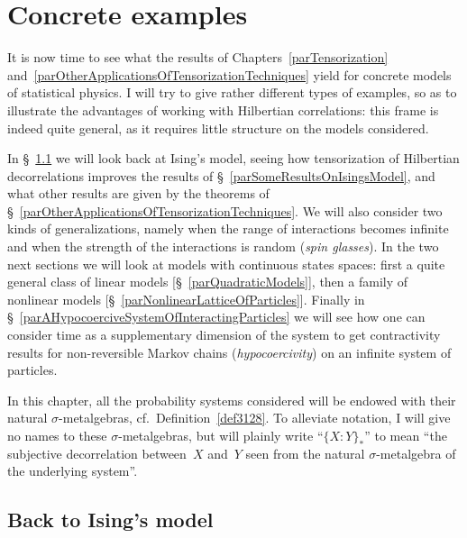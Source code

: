 \chapter{Concrete examples}\label{parApplications}%

It is now time to see what the results of Chapters~\ref{parTensorization}
and~\ref{parOtherApplicationsOfTensorizationTechniques}
yield for concrete models of statistical physics.
I will try to give rather different types of examples,
so as to illustrate the advantages of working with Hilbertian correlations:
this frame is indeed quite general, as it requires little structure on the models considered.

In \S~\ref{parBackToIsingsModel} we will look back at Ising's model,
seeing how tensorization of Hilbertian decorrelations
improves the results of \S~\ref{parSomeResultsOnIsingsModel},
and what other results are given by the theorems of
\S~\ref{parOtherApplicationsOfTensorizationTechniques}.
We will also consider two kinds of generalizations, namely
when the range of interactions becomes infinite
and when the strength of the interactions is random (\emph{spin glasses}).
In the two next sections we will look at models with continuous states spaces:
first a quite general class of linear models [\S~\ref{parQuadraticModels}],
then a family of nonlinear models [\S~\ref{parNonlinearLatticeOfParticles}].
Finally in \S~\ref{parAHypocoerciveSystemOfInteractingParticles} we will see
how one can consider time as a supplementary dimension of the system
to get contractivity results for non-reversible Markov chains
(\emph{hypocoercivity}) on an infinite system of particles.

\begin{NOTA}
In this chapter, all the probability systems considered
will be endowed with their natural $\sigma$-metalgebras,
cf.\ Definition~\ref{def3128}.
To alleviate notation, I will give no names to these $\sigma$-metalgebras,
but will plainly write ``${\{X:Y\}_*}$'' to mean
``the subjective decorrelation between~$X$ and~$Y$
seen from the natural $\sigma$-metalgebra of the underlying system''.
\end{NOTA}



\section{Back to Ising's model}\label{parBackToIsingsModel}

